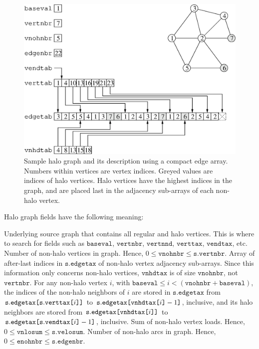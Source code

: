 \begin{figure}
\centering\includegraphics[scale=0.47]{m_f_gr3.eps}
\caption{Sample halo graph and its description using a compact edge
array. Numbers within vertices are vertex indices. Greyed values
are indices of halo vertices. Halo vertices have the highest indices
in the graph, and are placed last in the adjacency sub-arrays of each
non-halo vertex.}
\label{fig-lib-hgraf-one}
\end{figure}

Halo graph fields have the following meaning:
\begin{itemize}
\iteme[\texttt{s}]
Underlying source graph that contains all regular and halo
vertices. This is where to search for fields such as
$\mathtt{baseval}$, $\mathtt{vertnbr}$, $\mathtt{vertnnd}$,
$\mathtt{verttax}$, $\mathtt{vendtax}$, etc.
Number of non-halo vertices in graph. Hence, $0 \leq \mathtt{vnohnbr}
\leq \mathtt{s.vertnbr}$.
Array of after-last indices in $\mathtt{s.edgetax}$ of non-halo vertex
adjacency sub-arrays. Since this information only concerns non-halo
vertices, $\mathtt{vnhdtax}$ is of size $\mathtt{vnohnbr}$, not
$\mathtt{vertnbr}$.
For any non-halo vertex $i$, with $\mathtt{baseval} \leq i <
(\mathtt{vnohnbr} + \mathtt{baseval})$, the indices of the non-halo
neighbors of $i$ are stored in $\mathtt{s.edgetax}$ from $\mathtt{s.edgetax}\lbt
\mbox{\texttt{[}}\mathtt{s.verttax}\mbox{\texttt{[}}i\mbox{\texttt{]]}}$
to $\mathtt{s.edgetax}\lbt
\mbox{\texttt{[}}\mathtt{vnhdtax}\mbox{\texttt{[}}i\mbox{\texttt{]}} -
1\mbox{\texttt{]}}$, inclusive, and its halo neighbors are stored from 
$\mathtt{s.edgetax}\lbt
\mbox{\texttt{[}}\mathtt{vnhdtax}\mbox{\texttt{[}}i\mbox{\texttt{]]}}$
to $\mathtt{s.edgetax}\lbt
\mbox{\texttt{[}}\mathtt{s.vendtax}\mbox{\texttt{[}}i\mbox{\texttt{]}} -
1\mbox{\texttt{]}}$, inclusive.
Sum of non-halo vertex loads. Hence, $0 \leq \mathtt{vnlosum}
\leq \mathtt{s.velosum}$.
Number of non-halo arcs in graph. Hence, $0 \leq \mathtt{enohnbr}
\leq \mathtt{s.edgenbr}$.
\end{itemize}

